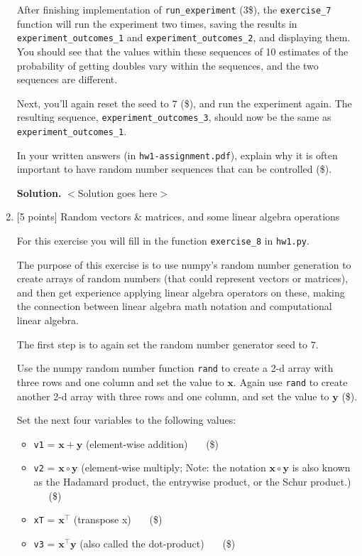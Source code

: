 \documentclass[10pt]{article}
\begin{document}
\begin{enumerate}
After finishing implementation of {\tt run\_experiment} (3\$), the {\tt exercise\_7} function will run the experiment two times, saving the results in {\tt experiment\_outcomes\_1} and {\tt experiment\_outcomes\_2}, and displaying them. You should see that the values within these sequences of 10 estimates of the probability of getting doubles vary within the sequences, and the two sequences are different.

Next, you'll again reset the seed to $7$ (\$), and run the experiment again. The resulting sequence, {\tt experiment\_outcomes\_3}, should now be the same as {\tt experiment\_outcomes\_1}.

In your written answers (in {\tt hw1-assignment.pdf}), explain why it is often important to have random number sequences that can be controlled (\$).

{\bf Solution.} $<$Solution goes here$>$\\


\item \label{prob:8} [5 points] Random vectors \& matrices, and some linear algebra operations

For this exercise you will fill in the function {\tt exercise\_8} in {\tt hw1.py}.

The purpose of this exercise is to use numpy's random number generation to create arrays of random numbers (that could represent vectors or matrices), and then get experience applying linear algebra operators on these, making the connection between linear algebra math notation and computational linear algebra.

The first step is to again set the random number generator seed to $7$.

Use the numpy random number function {\tt rand} to create a 2-d array with three rows and one column and set the value to $\mathbf{x}$. Again use {\tt rand} to create another 2-d array with three rows and one column, and set the value to $\mathbf{y}$ (\$).

Set the next four variables to the following values:
\begin{itemize}
\item {\tt v1} = $\mathbf{x} + \mathbf{y}$ (element-wise addition) ~~~(\$)
\item {\tt v2} = $\mathbf{x} \circ \mathbf{y}$ (element-wise multiply; Note: the notation $\mathbf{x} \circ \mathbf{y}$ is also known as the Hadamard product, the entrywise product, or the Schur product.) ~~~(\$)
\item {\tt xT} = $\mathbf{x}^\top$ (transpose x) ~~~(\$)
\item {\tt v3} = $\mathbf{x}^\top \mathbf{y}$  (also called the dot-product) ~~~(\$)
\end{itemize}


\end{enumerate}
\end{document}
